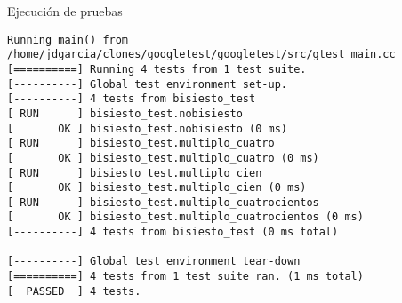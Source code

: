 \begin{frame}[t,fragile]{Ejecución de pruebas}
\begin{lstlisting}[style=terminal]
Running main() from /home/jdgarcia/clones/googletest/googletest/src/gtest_main.cc
[==========] Running 4 tests from 1 test suite.
[----------] Global test environment set-up.
[----------] 4 tests from bisiesto_test
[ RUN      ] bisiesto_test.nobisiesto
[       OK ] bisiesto_test.nobisiesto (0 ms)
[ RUN      ] bisiesto_test.multiplo_cuatro
[       OK ] bisiesto_test.multiplo_cuatro (0 ms)
[ RUN      ] bisiesto_test.multiplo_cien
[       OK ] bisiesto_test.multiplo_cien (0 ms)
[ RUN      ] bisiesto_test.multiplo_cuatrocientos
[       OK ] bisiesto_test.multiplo_cuatrocientos (0 ms)
[----------] 4 tests from bisiesto_test (0 ms total)

[----------] Global test environment tear-down
[==========] 4 tests from 1 test suite ran. (1 ms total)
[  PASSED  ] 4 tests.
\end{lstlisting}
\end{frame}
